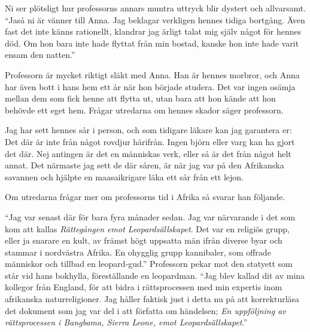 \begin{displayquote}
	Ni ser plötsligt hur professorns annars muntra uttryck blir dystert och allvarsamt.
	``Jaså ni är vänner till Anna. Jag beklagar verkligen hennes tidiga bortgång. Även fast det inte känns rationellt, klandrar jag ärligt talat mig själv något för hennes död. Om hon bara inte hade flyttat från min bostad, kanske hon inte hade varit ensam den natten.'' 
\end{displayquote}
%
Professorn är mycket riktigt släkt med Anna. Han är hennes morbror, och Anna har även bott i hans hem ett år när hon började studera. Det var ingen osämja mellan dem som fick henne att flytta ut, utan bara att hon kände att hon behövde ett eget hem. Frågar utredarna om hennes skador säger professorn.

\begin{displayquote}
	Jag har sett hennes sår i person, och som tidigare läkare kan jag garantera er: Det där är inte från något rovdjur härifrån. Ingen björn eller varg kan ha gjort det där. Nej antingen är det en människas verk, eller så är det från något helt annat. Det närmaste jag sett de där såren, är när jag var på den Afrikanska savannen och hjälpte en maasaikrigare läka ett sår från ett lejon.
\end{displayquote}
%
Om utredarna frågar mer om professorns tid i Afrika så svarar han följande.
%
\begin{displayquote}
	``Jag var senast där för bara fyra månader sedan. Jag var närvarande i det som kom att kallas \textit{Rättegången emot Leopardsällskapet}. Det var en religiös grupp, eller ja snarare en kult, av främst högt uppsatta män ifrån diverse byar och stammar i nordvästra Afrika. En ohygglig grupp kannibaler, som offrade människor och tillbad en leopard-gud.'' Professorn pekar mot den statyett som står vid hans bokhylla, föreställande en leopardman. ``Jag blev kallad dit av mina kollegor från England, för att bidra i rättsprocessen med min expertis inom afrikanska naturreligioner. Jag håller faktisk just i detta nu på att korrekturläsa det dokument som jag var del i att författa om händelsen; \textit{En uppföljning av rättsprocessen i Bangbama, Sierra Leone, emot Leopardsällskapet}.''
\end{displayquote}

